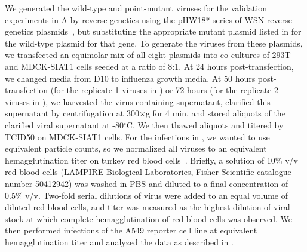 \documentclass[9pt,lineno]{elife}
\begin{document}
We generated the wild-type and point-mutant viruses for the validation experiments in A by reverse genetics using the pHW18* series of WSN reverse genetics plasmids~\citep{hoffmann2000dna}, but substituting the appropriate mutant plasmid listed in  for the wild-type plasmid for that gene.
To generate the viruses from these plasmids, we transfected an equimolar mix of all eight plasmids into co-cultures of 293T and MDCK-SIAT1 cells seeded at a ratio of 8:1.
At 24 hours post-transfection, we changed media from D10 to influenza growth media. 
At 50 hours post-transfection (for the replicate 1 viruses in ) or 72 hours (for the replicate 2 viruses in ), we harvested the virus-containing supernatant, clarified this supernatant by centrifugation at 300$\times$g for 4 min, and stored aliquots of the clarified viral supernatant at -80$^{\circ}$C.
We then thawed aliquots and titered by TCID50 on MDCK-SIAT1 cells.
For the infections in , we wanted to use equivalent particle counts, so we normalized all viruses to an equivalent hemagglutination titer on turkey red blood cells~\citep{hirst1942quantitative}.
 Briefly, a solution of 10\% v/v red blood cells (LAMPIRE Biological Laboratories, Fisher Scientific catalogue number 50412942)  was washed in PBS and diluted to a final concentration of 0.5\% v/v. 
Two-fold serial dilutions of virus were added to an equal volume of diluted red blood cells, and titer was measured as the highest dilution of viral stock at which complete hemagglutination of red blood cells was observed.
We then performed infections of the A549 reporter cell line at equivalent hemagglutination titer and analyzed the data as described in . 
\end{document}
